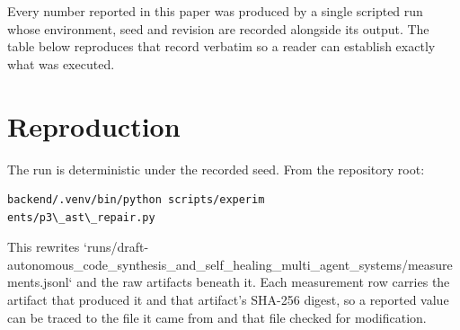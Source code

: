 \documentclass[10pt,twocolumn,letterpaper]{article}
\begin{document}
Every number reported in this paper was produced by a single scripted run whose environment, seed and revision are recorded alongside its output. The table below reproduces that record verbatim so a reader can establish exactly what was executed.
\begin{table}[htbp]
\centering
{}
\end{table}


\section{Reproduction}


The run is deterministic under the recorded seed. From the repository root:


\begin{scriptsize}
\begin{verbatim}
backend/.venv/bin/python scripts/experim
ents/p3\_ast\_repair.py
\end{verbatim}
\end{scriptsize}


This rewrites `runs/draft-autonomous\_code\_synthesis\_and\_self\_healing\_multi\_agent\_systems/measurements.jsonl` and the raw artifacts beneath it. Each measurement row carries the artifact that produced it and that artifact's SHA-256 digest, so a reported value can be traced to the file it came from and that file checked for modification.
\end{document}
